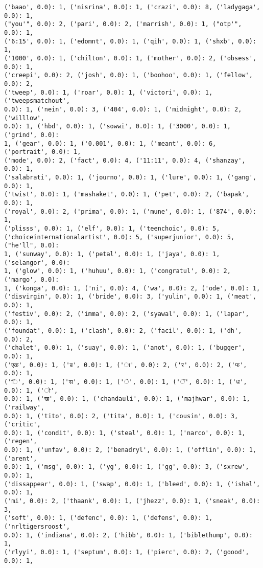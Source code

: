 \documentclass[11pt]{article}
\begin{document}
\begin{Verbatim}[commandchars=\\\{\}]
('baao', 0.0): 1, ('nisrina', 0.0): 1, ('crazi', 0.0): 8, ('ladygaga', 0.0): 1,
("you'", 0.0): 2, ('pari', 0.0): 2, ('marrish', 0.0): 1, ("otp'", 0.0): 1,
('6:15', 0.0): 1, ('edomnt', 0.0): 1, ('qih', 0.0): 1, ('shxb', 0.0): 1,
('1000', 0.0): 1, ('chilton', 0.0): 1, ('mother', 0.0): 2, ('obsess', 0.0): 1,
('creepi', 0.0): 2, ('josh', 0.0): 1, ('boohoo', 0.0): 1, ('fellow', 0.0): 2,
('tweep', 0.0): 1, ('roar', 0.0): 1, ('victori', 0.0): 1, ('tweepsmatchout',
0.0): 1, ('nein', 0.0): 3, ('404', 0.0): 1, ('midnight', 0.0): 2, ('willlow',
0.0): 1, ('hbd', 0.0): 1, ('sowwi', 0.0): 1, ('3000', 0.0): 1, ('grind', 0.0):
1, ('gear', 0.0): 1, ('0.001', 0.0): 1, ('meant', 0.0): 6, ('portrait', 0.0): 1,
('mode', 0.0): 2, ('fact', 0.0): 4, ('11:11', 0.0): 4, ('shanzay', 0.0): 1,
('salabrati', 0.0): 1, ('journo', 0.0): 1, ('lure', 0.0): 1, ('gang', 0.0): 1,
('twist', 0.0): 1, ('mashaket', 0.0): 1, ('pet', 0.0): 2, ('bapak', 0.0): 1,
('royal', 0.0): 2, ('prima', 0.0): 1, ('mune', 0.0): 1, ('874', 0.0): 1,
('plisss', 0.0): 1, ('elf', 0.0): 1, ('teenchoic', 0.0): 5,
('choiceinternationalartist', 0.0): 5, ('superjunior', 0.0): 5, ("he'll", 0.0):
1, ('sunway', 0.0): 1, ('petal', 0.0): 1, ('jaya', 0.0): 1, ('selangor', 0.0):
1, ('glow', 0.0): 1, ('huhuu', 0.0): 1, ('congratul', 0.0): 2, ('margo', 0.0):
1, ('konga', 0.0): 1, ('ni', 0.0): 4, ('wa', 0.0): 2, ('ode', 0.0): 1,
('disvirgin', 0.0): 1, ('bride', 0.0): 3, ('yulin', 0.0): 1, ('meat', 0.0): 1,
('festiv', 0.0): 2, ('imma', 0.0): 2, ('syawal', 0.0): 1, ('lapar', 0.0): 1,
('foundat', 0.0): 1, ('clash', 0.0): 2, ('facil', 0.0): 1, ('dh', 0.0): 2,
('chalet', 0.0): 1, ('suay', 0.0): 1, ('anot', 0.0): 1, ('bugger', 0.0): 1,
('एक', 0.0): 1, ('ब', 0.0): 1, ('ा', 0.0): 2, ('र', 0.0): 2, ('फ', 0.0): 1,
('ि', 0.0): 1, ('स', 0.0): 1, ('े', 0.0): 1, ('ँ', 0.0): 1, ('ध', 0.0): 1, ('ो',
0.0): 1, ('ख', 0.0): 1, ('chandauli', 0.0): 1, ('majhwar', 0.0): 1, ('railway',
0.0): 1, ('tito', 0.0): 2, ('tita', 0.0): 1, ('cousin', 0.0): 3, ('critic',
0.0): 1, ('condit', 0.0): 1, ('steal', 0.0): 1, ('narco', 0.0): 1, ('regen',
0.0): 1, ('unfav', 0.0): 2, ('benadryl', 0.0): 1, ('offlin', 0.0): 1, ('arent',
0.0): 1, ('msg', 0.0): 1, ('yg', 0.0): 1, ('gg', 0.0): 3, ('sxrew', 0.0): 1,
('dissappear', 0.0): 1, ('swap', 0.0): 1, ('bleed', 0.0): 1, ('ishal', 0.0): 1,
('mi', 0.0): 2, ('thaank', 0.0): 1, ('jhezz', 0.0): 1, ('sneak', 0.0): 3,
('soft', 0.0): 1, ('defenc', 0.0): 1, ('defens', 0.0): 1, ('nrltigersroost',
0.0): 1, ('indiana', 0.0): 2, ('hibb', 0.0): 1, ('biblethump', 0.0): 1,
('rlyyi', 0.0): 1, ('septum', 0.0): 1, ('pierc', 0.0): 2, ('goood', 0.0): 1,

\end{Verbatim}
\end{document}
